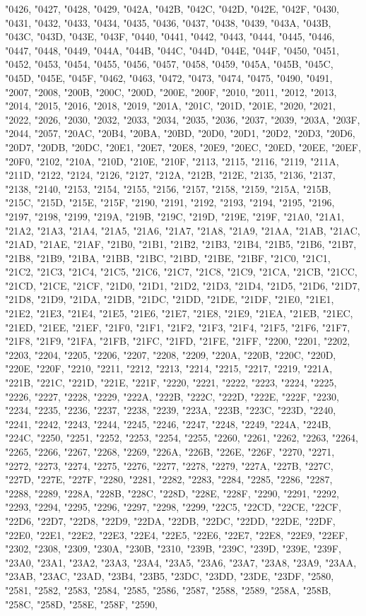 "0426, "0427, "0428, "0429, "042A, "042B, "042C, "042D, "042E, "042F, "0430, "0431, "0432, "0433, "0434, "0435, "0436, "0437, "0438, "0439, "043A, "043B, "043C, "043D, "043E, "043F, "0440, "0441, "0442, "0443, "0444, "0445, "0446, "0447, "0448, "0449, "044A, "044B, "044C, "044D, "044E, "044F, "0450, "0451, "0452, "0453, "0454, "0455, "0456, "0457, "0458, "0459, "045A, "045B, "045C, "045D, "045E, "045F, "0462, "0463, "0472, "0473, "0474, "0475, "0490, "0491, "2007, "2008, "200B, "200C, "200D, "200E, "200F, "2010, "2011, "2012, "2013, "2014, "2015, "2016, "2018, "2019, "201A, "201C, "201D, "201E, "2020, "2021, "2022, "2026, "2030, "2032, "2033, "2034, "2035, "2036, "2037, "2039, "203A, "203F, "2044, "2057, "20AC, "20B4, "20BA, "20BD, "20D0, "20D1, "20D2, "20D3, "20D6, "20D7, "20DB, "20DC, "20E1, "20E7, "20E8, "20E9, "20EC, "20ED, "20EE, "20EF, "20F0, "2102, "210A, "210D, "210E, "210F, "2113, "2115, "2116, "2119, "211A, "211D, "2122, "2124, "2126, "2127, "212A, "212B, "212E, "2135, "2136, "2137, "2138, "2140, "2153, "2154, "2155, "2156, "2157, "2158, "2159, "215A, "215B, "215C, "215D, "215E, "215F, "2190, "2191, "2192, "2193, "2194, "2195, "2196, "2197, "2198, "2199, "219A, "219B, "219C, "219D, "219E, "219F, "21A0, "21A1, "21A2, "21A3, "21A4, "21A5, "21A6, "21A7, "21A8, "21A9, "21AA, "21AB, "21AC, "21AD, "21AE, "21AF, "21B0, "21B1, "21B2, "21B3, "21B4, "21B5, "21B6, "21B7, "21B8, "21B9, "21BA, "21BB, "21BC, "21BD, "21BE, "21BF, "21C0, "21C1, "21C2, "21C3, "21C4, "21C5, "21C6, "21C7, "21C8, "21C9, "21CA, "21CB, "21CC, "21CD, "21CE, "21CF, "21D0, "21D1, "21D2, "21D3, "21D4, "21D5, "21D6, "21D7, "21D8, "21D9, "21DA, "21DB, "21DC, "21DD, "21DE, "21DF, "21E0, "21E1, "21E2, "21E3, "21E4, "21E5, "21E6, "21E7, "21E8, "21E9, "21EA, "21EB, "21EC, "21ED, "21EE, "21EF, "21F0, "21F1, "21F2, "21F3, "21F4, "21F5, "21F6, "21F7, "21F8, "21F9, "21FA, "21FB, "21FC, "21FD, "21FE, "21FF, "2200, "2201, "2202, "2203, "2204, "2205, "2206, "2207, "2208, "2209, "220A, "220B, "220C, "220D, "220E, "220F, "2210, "2211, "2212, "2213, "2214, "2215, "2217, "2219, "221A, "221B, "221C, "221D, "221E, "221F, "2220, "2221, "2222, "2223, "2224, "2225, "2226, "2227, "2228, "2229, "222A, "222B, "222C, "222D, "222E, "222F, "2230, "2234, "2235, "2236, "2237, "2238, "2239, "223A, "223B, "223C, "223D, "2240, "2241, "2242, "2243, "2244, "2245, "2246, "2247, "2248, "2249, "224A, "224B, "224C, "2250, "2251, "2252, "2253, "2254, "2255, "2260, "2261, "2262, "2263, "2264, "2265, "2266, "2267, "2268, "2269, "226A, "226B, "226E, "226F, "2270, "2271, "2272, "2273, "2274, "2275, "2276, "2277, "2278, "2279, "227A, "227B, "227C, "227D, "227E, "227F, "2280, "2281, "2282, "2283, "2284, "2285, "2286, "2287, "2288, "2289, "228A, "228B, "228C, "228D, "228E, "228F, "2290, "2291, "2292, "2293, "2294, "2295, "2296, "2297, "2298, "2299, "22C5, "22CD, "22CE, "22CF, "22D6, "22D7, "22D8, "22D9, "22DA, "22DB, "22DC, "22DD, "22DE, "22DF, "22E0, "22E1, "22E2, "22E3, "22E4, "22E5, "22E6, "22E7, "22E8, "22E9, "22EF, "2302, "2308, "2309, "230A, "230B, "2310, "239B, "239C, "239D, "239E, "239F, "23A0, "23A1, "23A2, "23A3, "23A4, "23A5, "23A6, "23A7, "23A8, "23A9, "23AA, "23AB, "23AC, "23AD, "23B4, "23B5, "23DC, "23DD, "23DE, "23DF, "2580, "2581, "2582, "2583, "2584, "2585, "2586, "2587, "2588, "2589, "258A, "258B, "258C, "258D, "258E, "258F, "2590, 